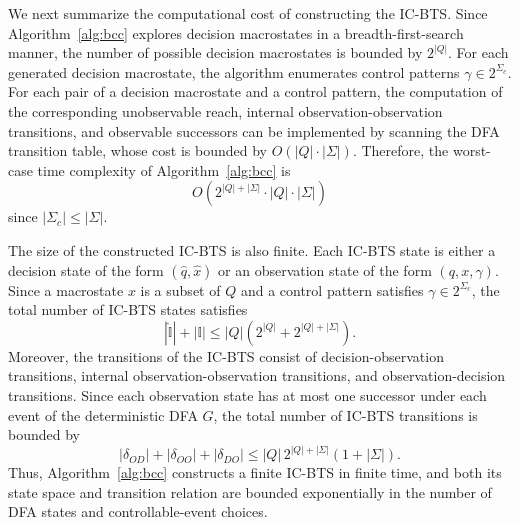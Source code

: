 \documentclass[twocolumn]{autart}
\begin{document}
%

We next summarize the computational cost of constructing the IC-BTS. 
Since Algorithm~\ref{alg:bcc} explores decision macrostates in a breadth-first-search manner, the number of possible decision macrostates is bounded by $2^{|Q|}$. 
For each generated decision macrostate, the algorithm enumerates control patterns $\gamma \in 2^{\Sigma_c}$. 
For each pair of a decision macrostate and a control pattern, the computation of the corresponding unobservable reach, internal observation-observation transitions, and observable successors can be implemented by scanning the DFA transition table, whose cost is bounded by $O(|Q|\cdot |\Sigma|)$. Therefore, the worst-case time complexity of Algorithm~\ref{alg:bcc} is
$$
O(2^{|Q| + |\Sigma|} \cdot |Q| \cdot |\Sigma|)
$$
since $|\Sigma_c|\leq |\Sigma|$.

The size of the constructed IC-BTS is also finite. 
Each IC-BTS state is either a decision state of the form $(\hat{q}, \hat{x})$ or an observation state of the form $(q, x, \gamma)$. Since a macrostate $x$ is a subset of $Q$ and a control pattern satisfies $\gamma\in 2^{\Sigma_c}$, the total number of IC-BTS states satisfies
\begin{equation}
    \label{eq:prop:bcc:1}
    |\hat{\mathbb{I}}| + |\mathbb{I}| \leq |Q|(2^{|Q|}+2^{|Q|+|\Sigma|}).    
\end{equation}
Moreover, the transitions of the IC-BTS consist of decision-observation transitions, internal observation-observation transitions, and observation-decision transitions. Since each observation state has at most one successor under each event of the deterministic DFA $G$, the total number of IC-BTS transitions is bounded by
\begin{equation}
    \label{eq:prop:bcc:2}
    |\delta_{OD}| + |\delta_{OO}| + |\delta_{DO}| \leq |Q|\,2^{|Q|+|\Sigma|}(1+|\Sigma|).
\end{equation}
Thus, Algorithm~\ref{alg:bcc} constructs a finite IC-BTS in finite time, and both its state space and transition relation are bounded exponentially in the number of DFA states and controllable-event choices.
\end{document}
